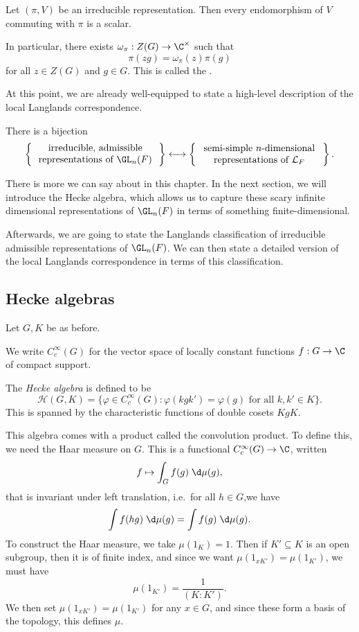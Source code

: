 \documentclass[a4paper]{article}
\begin{document}
\begin{lemma}
  Let $(\pi, V)$ be an irreducible representation. Then every endomorphism of $V$ commuting with $\pi$ is a scalar.

  In particular, there exists $\omega_\pi: Z(G) \to \C^\times$ such that
  \[
    \pi(zg) = \omega_\pi(z) \pi(g)
  \]
  for all $z \in Z(G)$ and $g \in G$. This is called the .\fakeqed
\end{lemma}

At this point, we are already well-equipped to state a high-level description of the local Langlands correspondence.
\begin{thm}
  There is a bijection
  \[
    \left\{\parbox{4.6cm}{\centering irreducible, admissible representations of $\GL_n(F)$}\right\} \longleftrightarrow \left\{\parbox{4.6cm}{\centering semi-simple $n$-dimensional representations of $\mathcal{L}_F$}\right\}.
  \]
\end{thm}

There is more we can say about in this chapter. In the next section, we will introduce the Hecke algebra, which allows us to capture these scary infinite dimensional representations of $\GL_n(F)$ in terms of something finite-dimensional.

Afterwards, we are going to state the Langlands classification of irreducible admissible representations of $\GL_n(F)$. We can then state a detailed version of the local Langlands correspondence in terms of this classification.

\subsection{Hecke algebras}
Let $G, K$ be as before.
\begin{notation}
  We write $C_c^\infty(G)$ for the vector space of locally constant functions $f: G \to \C$ of compact support.
\end{notation}

\begin{defi}
  The \emph{Hecke algebra} is defined to be
  \[
    \mathcal{H}(G, K) = \{\varphi \in C_c^\infty(G) : \varphi(kgk') = \varphi(g)\text{ for all }k, k' \in K\}.
  \]
  This is spanned by the characteristic functions of double cosets $KgK$.
\end{defi}
This algebra comes with a product called the convolution product. To define this, we need the Haar measure on $G$. This is a functional $C_c^\infty(G) \to \C$, written
\[
  f \mapsto \int_G f(g) \;\d \mu (g),
\]
that is invariant under left translation, i.e.\ for all $h \in G$,we have
\[
  \int f(hg) \;\d \mu(g) = \int f(g)\;\d \mu(g).
\]
To construct the Haar measure, we take $\mu(1_K) = 1$. Then if $K' \subseteq K$ is an open subgroup, then it is of finite index, and since we want $\mu(1_{xK'}) = \mu(1_{K'})$, we must have
\[
  \mu(1_{K'}) = \frac{1}{(K:K')}.
\]
We then set $\mu(1_{xK'}) = \mu(1_{K'})$ for any $x \in G$, and since these form a basis of the topology, this defines $\mu$.
\end{document}
